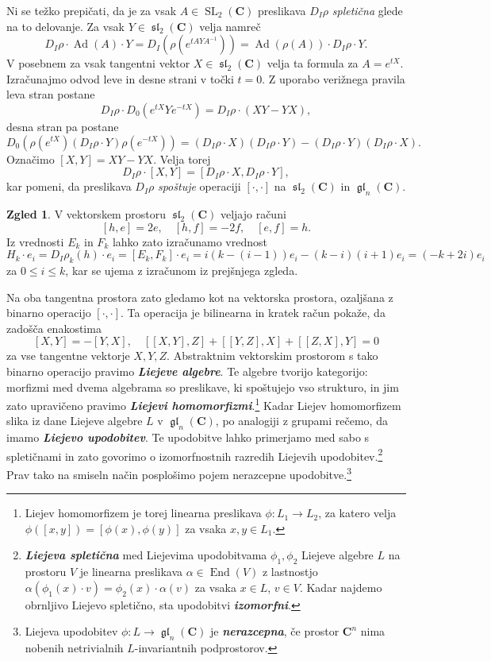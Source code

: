 \documentclass[11pt]{book}
\def\CC{\mathbf{C}}
\DeclareMathOperator\glfrak{\mathfrak{gl}}
\DeclareMathOperator\slfrak{\mathfrak{sl}}
\DeclareMathOperator\SL{SL}
\DeclareMathOperator\End{End}
\DeclareMathOperator\Ad{Ad}
\def\definicija{\color{rdeca}\bf\em}
\theoremstyle{definition}
\theoremstyle{zgled}
\newtheorem*{zgled}{Zgled}
\theoremstyle{odprtproblem}
\theoremstyle{domacanaloga}
\theoremstyle{izrek}
\begin{document}
Ni se težko prepičati, da je za vsak $A \in \SL_2(\CC)$ preslikava $D_I \rho$ \emph{spletična} glede na to delovanje. Za vsak $Y \in \slfrak_2(\CC)$ velja namreč
\[
    D_I \rho \cdot \Ad(A) \cdot Y
    = D_I \left( \rho(e^{t A Y A^{-1}}) \right)
    = \Ad(\rho(A)) \cdot D_I \rho \cdot Y.
\]
V posebnem za vsak tangentni vektor $X \in \slfrak_2(\CC)$ velja ta formula za $A = e^{tX}$. Izračunajmo odvod leve in desne strani v točki $t = 0$. Z uporabo verižnega pravila leva stran postane
\[
    \textstyle D_I \rho \cdot D_0 \left( e^{tX} Y e^{-tX} \right)
    = D_I \rho \cdot (XY - YX),
\]
desna stran pa postane
\[
    \textstyle D_0 \left( \rho(e^{tX}) (D_I \rho \cdot Y) \rho(e^{-tX}) \right)
    = (D_I \rho \cdot X) (D_I \rho \cdot Y) -  (D_I \rho \cdot Y) (D_I \rho \cdot X).
\]
Označimo $[X,Y] = XY - YX$. Velja torej
\[
    D_I \rho \cdot [X,Y] = [D_I \rho \cdot X, D_I \rho \cdot Y],
\]
kar pomeni, da preslikava $D_I \rho$ \emph{spoštuje} operaciji $[\cdot, \cdot]$ na $\slfrak_2(\CC)$ in $\glfrak_n(\CC)$.

\begin{zgled}
V vektorskem prostoru $\slfrak_2(\CC)$ veljajo računi
\[
    [h,e] = 2e, \quad
    [h,f] = -2f, \quad
    [e,f] = h.
\]
Iz vrednosti $E_k$ in $F_k$ lahko zato izračunamo vrednost
\[
    H_k \cdot e_i = D_I \rho_k (h) \cdot e_i = [E_k, F_k] \cdot e_i
    = i (k-(i-1)) e_i - (k-i) (i+1) e_i
    = (-k + 2i) e_i
\]
za $0 \leq i \leq k$, kar se ujema z izračunom iz prejšnjega zgleda.
\end{zgled}

Na oba tangentna prostora zato gledamo kot na vektorska prostora, ozaljšana z binarno operacijo $[\cdot, \cdot]$. Ta operacija je bilinearna in kratek račun pokaže, da zadošča enakostima
\[
    [X,Y] = -[Y,X], \quad [[X,Y], Z] + [[Y,Z], X] + [[Z,X], Y] = 0
\]
za vse tangentne vektorje $X,Y,Z$. Abstraktnim vektorskim prostorom s tako binarno operacijo pravimo {\definicija Liejeve algebre}. Te algebre tvorijo kategorijo: morfizmi med dvema algebrama so preslikave, ki spoštujejo vso strukturo, in jim zato upravičeno pravimo {\definicija Liejevi homomorfizmi}.\footnote{Liejev homomorfizem je torej linearna preslikava $\phi \colon L_1 \to L_2$, za katero velja $\phi([x,y]) = [\phi(x), \phi(y)]$ za vsaka $x,y \in L_1$.} Kadar Liejev homomorfizem slika iz dane Liejeve algebre $L$ v $\glfrak_n(\CC)$, po analogiji z grupami rečemo, da imamo {\definicija Liejevo upodobitev}. Te upodobitve lahko primerjamo med sabo s spletičnami in zato govorimo o izomorfnostnih razredih Liejevih upodobitev.\footnote{{\definicija Liejeva spletična} med Liejevima upodobitvama $\phi_1, \phi_2$ Liejeve algebre $L$ na prostoru $V$ je linearna preslikava $\alpha \in \End(V)$ z lastnostjo $\alpha(\phi_1(x) \cdot v) = \phi_2(x) \cdot \alpha(v)$ za vsaka $x \in L$, $v \in V$. Kadar najdemo obrnljivo Liejevo spletično, sta upodobitvi {\definicija izomorfni}.} Prav tako na smiseln način posplošimo pojem nerazcepne upodobitve.\footnote{Liejeva upodobitev $\phi \colon L \to \glfrak_n(\CC)$ je {\definicija nerazcepna}, če prostor $\CC^n$ nima nobenih netrivialnih $L$-invariantnih podprostorov.}
\end{document}
